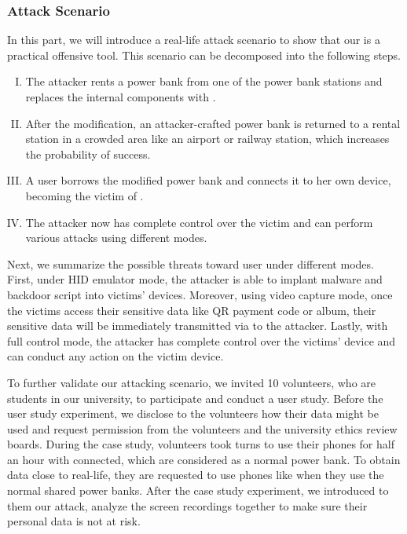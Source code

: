 \subsubsection{Attack Scenario}

In this part, we will introduce a real-life attack scenario to show that our
\tool is a practical offensive tool.  This scenario can be decomposed into the
following steps.

\begin{enumerate}[I. ]
	\item The attacker rents a power bank from one of the power bank stations and replaces the internal components with \tool.
	\item After the modification, an attacker-crafted power bank is returned to a rental station in a crowded area like an airport or railway station, which increases the probability of success.
	\item A user borrows the modified power bank and connects it to her own device, becoming the victim of \tool.
	\item The attacker now has complete control over the victim and can perform various attacks using different modes.
\end{enumerate}

Next, we summarize the possible threats toward user under different modes.
First, under HID emulator mode, the attacker is able to implant malware and backdoor script into victims' devices. Moreover, using video capture mode, once the victims access their sensitive data like QR payment  code or album, their sensitive data will be immediately transmitted via \tool to the attacker. Lastly, with full control mode, the attacker has complete control over the victims' device and can conduct any action on the victim device.


To further validate our attacking scenario, we invited 10 volunteers, who are students in our university, to participate and conduct a user study.
Before the user study experiment, we disclose to the volunteers how their data might be used and request permission from the volunteers and the university ethics review boards.
During the case study, volunteers took turns to use their phones for half an hour with \tool connected, which are considered as a normal power bank.
To obtain data close to real-life, they are requested to use phones like when they use the normal shared power banks.
After the case study experiment, we introduced to them our attack, analyze the screen recordings together to make sure their personal data is not at risk.


